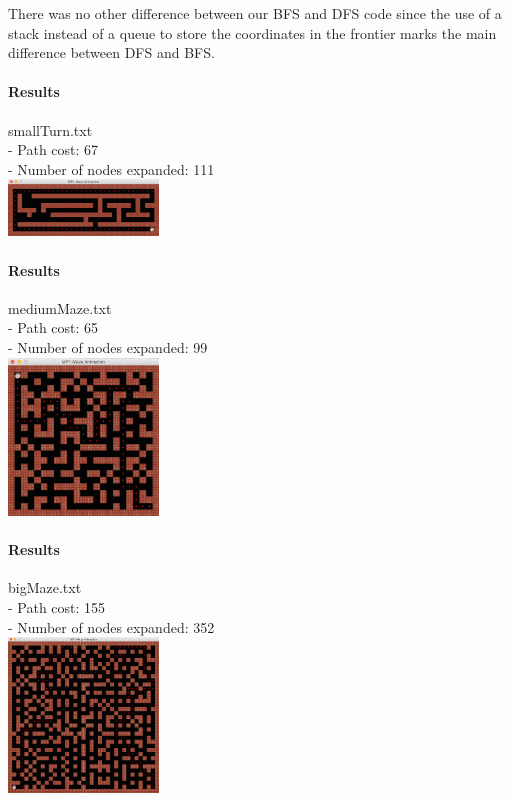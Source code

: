 \begin{multicols*}{2}
There was no other difference between our BFS and DFS code since the use of a stack instead of a queue to store the coordinates in the frontier marks the main difference between DFS and BFS.

\paragraph{Results}
smallTurn.txt\\
- Path cost: 67\\
- Number of nodes expanded: 111\\
\includegraphics[width=0.3\textwidth]{graphics/smallTurn_dfs.png}

\paragraph{Results}
mediumMaze.txt\\
- Path cost: 65\\
- Number of nodes expanded: 99\\
\includegraphics[width=0.3\textwidth]{graphics/mediumMaze_dfs.png}

\paragraph{Results}
bigMaze.txt\\
- Path cost: 155\\
- Number of nodes expanded: 352\\
\includegraphics[width=0.3\textwidth]{graphics/bigMaze_dfs.png}


\end{multicols*}
